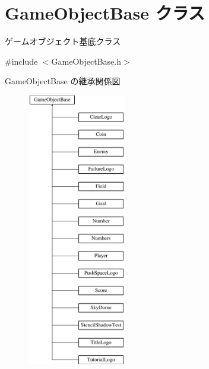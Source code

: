 \hypertarget{class_game_object_base}{}\section{Game\+Object\+Base クラス}
\label{class_game_object_base}


ゲームオブジェクト基底クラス  




{\ttfamily \#include $<$Game\+Object\+Base.\+h$>$}

Game\+Object\+Base の継承関係図\begin{figure}[H]
\begin{center}
\leavevmode
\includegraphics[height=12.000000cm]{class_game_object_base}
\end{center}
\end{figure}
